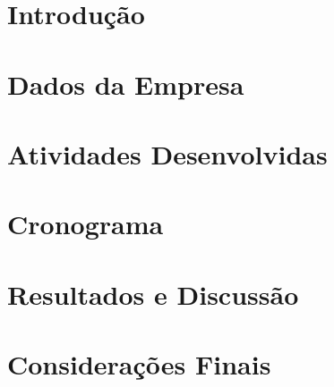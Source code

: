 
\section*{Introdução}
\lipsum[1]
\section*{Dados da Empresa}
\lipsum[2]
\section*{Atividades Desenvolvidas}
\lipsum[3]
\section*{Cronograma}
\lipsum[4]
\section*{Resultados e Discussão}
\lipsum[5]
\section*{Considerações Finais}
\lipsum[6]

